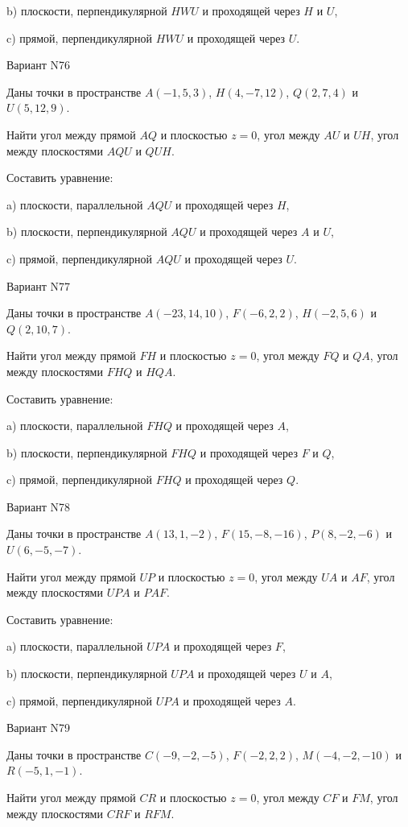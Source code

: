 \documentclass[11pt]{report}
\begin{document}
b) плоскости, перпендикулярной $HWU$ и проходящей через $H$ и $U$,

c) прямой, перпендикулярной $HWU$ и проходящей через $U$.

Вариант N76

Даны точки в пространстве
$A(-1, 5, 3)$, $H(4, -7, 12)$, $Q(2, 7, 4)$ и
$U(5, 12, 9)$.

Найти угол между прямой $AQ$ и плоскостью $z = 0$, угол между $AU$ и $UH$, угол между плоскостями $AQU$ 
и $QUH$.

Составить уравнение: 

a) плоскости, параллельной $AQU$ и проходящей через $H$,

b) плоскости, перпендикулярной $AQU$ и проходящей через $A$ и $U$,

c) прямой, перпендикулярной $AQU$ и проходящей через $U$.

Вариант N77

Даны точки в пространстве
$A(-23, 14, 10)$, $F(-6, 2, 2)$, $H(-2, 5, 6)$ и
$Q(2, 10, 7)$.

Найти угол между прямой $FH$ и плоскостью $z = 0$, угол между $FQ$ и $QA$, угол между плоскостями $FHQ$ 
и $HQA$.

Составить уравнение: 

a) плоскости, параллельной $FHQ$ и проходящей через $A$,

b) плоскости, перпендикулярной $FHQ$ и проходящей через $F$ и $Q$,

c) прямой, перпендикулярной $FHQ$ и проходящей через $Q$.

Вариант N78

Даны точки в пространстве
$A(13, 1, -2)$, $F(15, -8, -16)$, $P(8, -2, -6)$ и
$U(6, -5, -7)$.

Найти угол между прямой $UP$ и плоскостью $z = 0$, угол между $UA$ и $AF$, угол между плоскостями $UPA$ 
и $PAF$.

Составить уравнение: 

a) плоскости, параллельной $UPA$ и проходящей через $F$,

b) плоскости, перпендикулярной $UPA$ и проходящей через $U$ и $A$,

c) прямой, перпендикулярной $UPA$ и проходящей через $A$.

Вариант N79

Даны точки в пространстве
$C(-9, -2, -5)$, $F(-2, 2, 2)$, $M(-4, -2, -10)$ и
$R(-5, 1, -1)$.

Найти угол между прямой $CR$ и плоскостью $z = 0$, угол между $CF$ и $FM$, угол между плоскостями $CRF$ 
и $RFM$.
\end{document}
